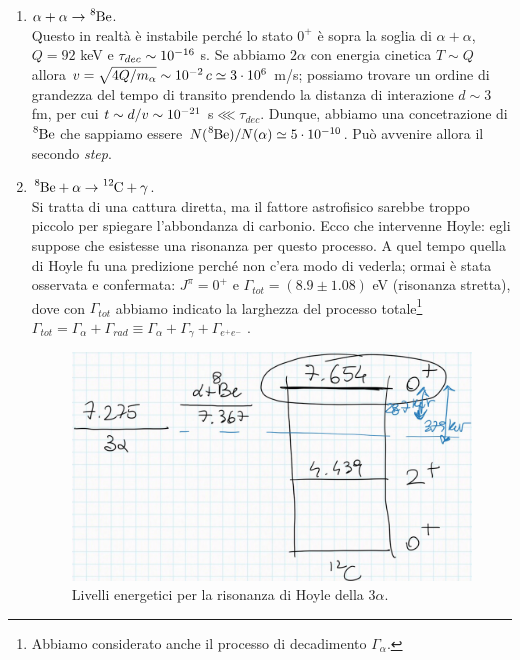 \begin{enumerate}[1)]
	\item $\alpha +\alpha \to \ce{^8Be}$.\\ 
	Questo in realtà è instabile perché lo stato $0^+$ è sopra la soglia di $\alpha+\alpha$, $Q=92$ keV e $\tau_{dec}\sim 10^{-16}$ s. Se abbiamo $2\alpha$ con energia cinetica $T\sim Q$ allora $v= \sqrt{4Q/m_\alpha}\sim 10^{-2}\, c \simeq 3\cdot10^{6}$ m/s; possiamo trovare un ordine di grandezza del tempo di transito prendendo la distanza di interazione $d\sim 3$ fm, per cui $t\sim d/v \sim 10^{-21}$ s$\lll \tau_{dec}$. Dunque, abbiamo una  concetrazione di $\ce{^8Be}$ che sappiamo essere $N(\ce{^8Be})/N(\alpha)\simeq 5\cdot\ord{-10}$. Può avvenire allora il secondo \textit{step}.
	\item $\ce{^8Be + \alpha \to \ce{^{12}C} +\gamma}$.\\ 
	Si tratta di una cattura diretta, ma il fattore astrofisico sarebbe troppo piccolo per spiegare l'abbondanza di carbonio. Ecco che intervenne Hoyle: egli suppose che esistesse una risonanza per questo processo. A quel tempo quella di Hoyle fu una predizione perché non c'era modo di vederla; ormai è stata osservata e confermata: $J^{\pi}=0^+$ e $\Gamma_{tot} = (8.9\pm 1.08)$ eV (risonanza stretta), dove con $\Gamma_{tot}$ abbiamo indicato la larghezza del processo totale\footnote{Abbiamo considerato anche il processo di decadimento $\Gamma_\alpha$.} $\Gamma_{tot} = \Gamma_\alpha + \Gamma_{rad}\equiv \Gamma_\alpha + \Gamma_\gamma + \Gamma_{e^+e^-}$ .
	\begin{figure}[!h]
		\centering
		\includegraphics[scale=0.4]{Immagini/0421_riso.png}
		\caption{Livelli energetici per la risonanza di Hoyle della $3\alpha$.}
		\label{0421_hoyle}
	\end{figure}
\end{enumerate}
